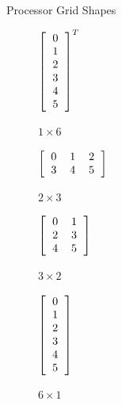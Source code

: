 \begin{frame}
\begin{block}{Processor Grid Shapes}
\begin{table}[ht]
        \centering
        \begin{subfigure}[b]{0.23\textwidth}
                \centering
              $\left[\begin{tabular}{l}
                  0 \\ 1 \\ 2 \\ 3 \\ 4 \\ 5
                \end{tabular}\right]^T$
                \caption{$1\times 6$}
        \end{subfigure}
        \begin{subfigure}[b]{0.23\textwidth}
                \centering
                $\left[\begin{tabular}{lll}
                  0 & 1 & 2\\
                  3 & 4 & 5
                \end{tabular}\right]$
                \caption{$2\times 3$}
        \end{subfigure}%
        \begin{subfigure}[b]{0.23\textwidth}
                \centering
              $\left[\begin{tabular}{ll}
                  0 & 1 \\
                  2 & 3\\
                  4 & 5
                \end{tabular}\right]$
                \caption{$3\times 2$}
        \end{subfigure}
        \begin{subfigure}[b]{0.23\textwidth}
                \centering
              $\left[\begin{tabular}{l}
                  0 \\ 1 \\ 2 \\ 3 \\ 4 \\ 5
                \end{tabular}\right]$
                \caption{$6\times 1$}
        \end{subfigure}
        \caption{Processor Grid Shapes with 6 Processors}\label{fig:gridshapes}
\end{table}
\end{block}
\end{frame}


